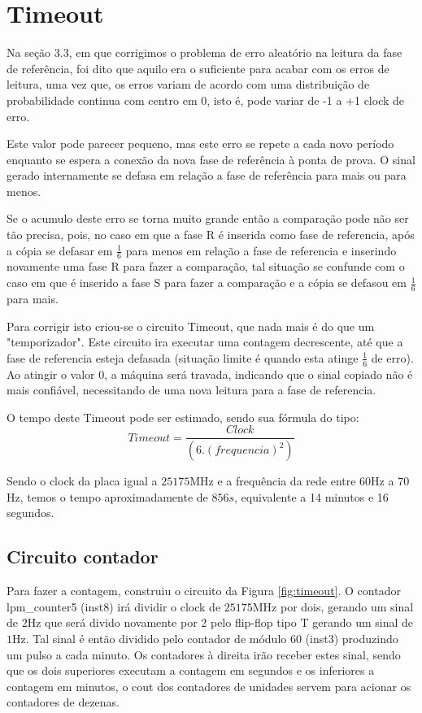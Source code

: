 \documentclass[12pt,a4paper,openany]{abntex2}
\begin{document}
\section{Timeout}

Na seção 3.3, em que corrigimos o problema de erro aleatório na leitura da fase de referência, foi dito que aquilo era o suficiente para acabar com os erros de leitura, uma vez que, os erros variam de acordo com uma distribuição de probabilidade continua com centro em 0, isto é, pode variar de -1 a +1 clock de erro.

Este valor pode parecer pequeno, mas este erro se repete a cada novo período enquanto se espera a conexão da nova fase de referência à ponta de prova. O sinal gerado internamente se defasa em relação a fase de referência para mais ou para menos.

Se o acumulo deste erro se torna muito grande então a comparação pode não ser tão precisa, pois, no caso em que a fase R é inserida como fase de referencia, após a cópia se defasar em $\frac{1}{6}$ para menos em relação a fase de referencia e inserindo novamente uma fase R para fazer a comparação, tal situação se confunde com o caso em que é inserido a fase S para fazer a comparação e a cópia se defasou em $\frac{1}{6}$ para mais.

Para corrigir isto criou-se o circuito Timeout, que nada mais é do que um "temporizador". Este circuito ira executar uma contagem decrescente, até que a fase de referencia esteja defasada (situação limite é quando esta atinge $\frac{1}{6}$ de erro). Ao atingir o valor 0, a máquina será travada, indicando que o sinal copiado não é mais confiável, necessitando de uma nova leitura para a fase de referencia.

O tempo deste Timeout pode ser estimado, sendo sua fórmula do tipo: $$Timeout = \frac{Clock}{\left(\left. 6 \right. . \left. \left(frequencia\right)^2\right.\right)}$$

Sendo o clock da placa igual a $25175$MHz e a frequência da rede entre $60$Hz a $70$Hz, temos o tempo aproximadamente de $856s$, equivalente a 14 minutos e 16 segundos.

\subsection{Circuito contador}

Para fazer a contagem, construiu o circuito da Figura \ref{fig:timeout}.
O contador lpm\_counter5 (inst8) irá dividir o clock de $25175$MHz por dois, gerando um sinal de $2$Hz que será divido novamente por 2 pelo flip-flop tipo T gerando um sinal de $1$Hz. Tal sinal é então dividido pelo contador de módulo 60 (inst3) produzindo um pulso a cada minuto. Os contadores à direita irão receber estes sinal, sendo que os dois superiores executam a contagem em segundos e os inferiores a contagem em minutos, o cout dos contadores de unidades servem para acionar os contadores de dezenas.
\end{document}
